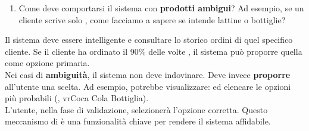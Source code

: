     \begin{enumerate}[resume*, itemsep=0pt, parsep=1pt, leftmargin=*, label=\arabic*.]
        \item Come deve comportarsi il sistema con \textbf{prodotti ambigui}? Ad esempio, se un cliente scrive solo , come facciamo a sapere se intende lattine o bottiglie?
    \end{enumerate} \vspace{-0.5em}
    Il sistema deve essere intelligente e consultare lo storico ordini di quel specifico cliente. Se il cliente ha ordinato il 90\% delle volte , il sistema può proporre quella come opzione primaria.\\
    Nei casi di \textbf{ambiguità}, il sistema non deve indovinare. Deve invece \textbf{proporre} all'utente una scelta. Ad esempio, potrebbe visualizzare:  ed elencare le opzioni più probabili (, vr{Coca Cola Bottiglia}).\\
    L'utente, nella fase di validazione, selezionerà l'opzione corretta. Questo meccanismo di  è una funzionalità chiave per rendere il sistema affidabile.
